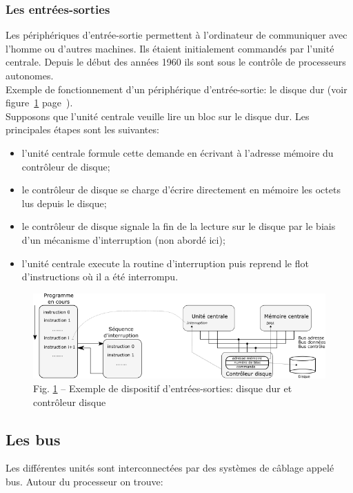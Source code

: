 \documentclass[11pt,french]{article}
\makeatletter
\def\maxwidth{\ifdim\Gin@nat@width>\linewidth\linewidth
    \else\Gin@nat@width\fi}
\let\Oldincludegraphics\includegraphics
\renewcommand{\includegraphics}[1]{\Oldincludegraphics[width=.8\maxwidth]{#1}}
\makeatother
\begin{document}
\hypertarget{les-io}{%
\subsubsection{Les entrées-sorties}\label{les-io}}
Les périphériques d’entrée-sortie permettent à l’ordinateur de communiquer avec l’homme ou d’autres machines. Ils étaient initialement commandés par l'unité centrale. Depuis le début des années 1960 ils sont sous le contrôle de processeurs autonomes. \\
Exemple de fonctionnement d'un périphérique d'entrée-sortie: le disque dur (voir figure~\ref{fig:ioprocess} page~\pageref{fig:ioprocess}).\\
Supposons que l'unité centrale veuille lire un bloc sur le disque dur. Les principales étapes sont les suivantes:
\begin{itemize}
\item l'unité centrale formule cette demande en écrivant à l'adresse mémoire du contrôleur de disque;
\item le contrôleur de disque se charge d'écrire directement en mémoire les octets lus depuis le disque;
\item le contrôleur de disque signale la fin de la lecture sur le disque par le biais d'un mécanisme d'interruption (non abordé ici);
\item l'unité centrale execute la routine d'interruption puis reprend le flot d'instructions où il a été interrompu.
\end{itemize}
\begin{figure}[h]
	\begin{center}
		\includegraphics{../img/ioprocessing.png}
	\end{center}
	\caption{Fig. \ref{fig:ioprocess} -- Exemple de dispositif d'entrées-sorties: disque dur et contrôleur disque}
	\label{fig:ioprocess}
\end{figure}

\hypertarget{les-bus}{%
\subsection{Les bus}\label{les-bus}}
  Les différentes unités sont interconnectées par des systèmes de
  câblage appelé bus. Autour du processeur on trouve:
\end{document}
